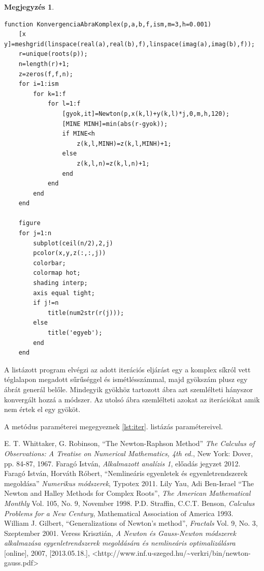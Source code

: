 \documentclass[a4paper,12pt]{report}
\newtheorem{Megj}[Tet]{Megjegyzés}
\begin{document}
\begin{appendices}
\begin{Megj}
			\end{Megj} 
			\begin{singlespace}
            \begin{lstlisting}[caption=KonvergenciaAbraKomplex.m]
function KonvergenciaAbraKomplex(p,a,b,f,ism,m=3,h=0.001)
    [x y]=meshgrid(linspace(real(a),real(b),f),linspace(imag(a),imag(b),f));
    r=unique(roots(p));
    n=length(r)+1;
    z=zeros(f,f,n);
    for i=1:ism
        for k=1:f
            for l=1:f
                [gyok,it]=Newton(p,x(k,l)+y(k,l)*j,0,m,h,120);
                [MINE MINH]=min(abs(r-gyok));
                if MINE<h
                    z(k,l,MINH)=z(k,l,MINH)+1;
                else
                    z(k,l,n)=z(k,l,n)+1;
                end
            end
        end
    end

    figure
    for j=1:n
        subplot(ceil(n/2),2,j)
        pcolor(x,y,z(:,:,j))
        colorbar;
        colormap hot;
        shading interp;
        axis equal tight;
        if j!=n
            title(num2str(r(j)));
        else
            title('egyeb');
        end
    end
			\end{lstlisting}
            \end{singlespace}
			A listázott program elvégzi az adott iterációs eljárást egy a komplex síkról vett téglalapon megadott sűrűséggel és ismétlésszámmal, majd gyökszám plusz egy ábrát generál belőle. Mindegyik gyökhöz tartozott ábra azt szemlélteti hányszor konvergált hozzá a módszer. Az utolsó ábra szemlélteti azokat az iterációkat amik nem értek el egy gyököt.

			A metódus paraméterei megegyeznek \ref{lst:iter}. listázás paramétereivel.
\end{appendices}

	\begin{thebibliography}{99}
    	 E. T. Whittaker, G. Robinson, ``The Newton-Raphson Method'' \emph{The Calculus of Observations: A Treatise on Numerical Mathematics, 4th ed.}, New York: Dover, pp. 84-87, 1967. 
		 Faragó István, \emph{Alkalmazott analízis 1}, előadás jegyzet 2012.
         Faragó István, Horváth Róbert, ``Nemlineáris egyenletek és egyenletrendszerek megoldása'' \emph{Numerikus módszerek}, Typotex 2011.
         Lily Yau, Adi Ben-Israel ``The Newton and Halley Methods for Complex Roots'', \emph{The American Mathematical Monthly} Vol. 105, No. 9, November 1998. %
		 P.D. Straffin, C.C.T. Benson, \emph{Calculus Problems for a New Century}, Mathematical Association of America 1993.
	 William J. Gilbert, ``Generalizations of Newton's method'', \emph{Fractals} Vol. 9, No. 3,  Szeptember 2001.
	 Veress Krisztián, \emph{A Newton és Gauss-Newton módszerek alkalmazása egyenletrendszerek megoldására és nemlineáris optimalizálásra} [online], 2007, [2013.05.18.], <http://www.inf.u-szeged.hu/\textasciitilde verkri/bin/newton-gauss.pdf>
        
	\end{thebibliography}
\end{document}
